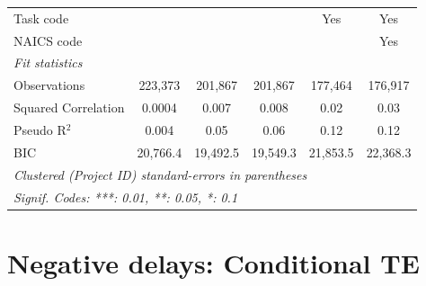\documentclass[
]{article}
\begin{document}
\begin{table}[htbp]
\begin{tabular}{lccccc}
      Task code                    &               &                &               & Yes           & Yes\\  
      NAICS code                   &               &                &               &               & Yes\\  
      \midrule
      \emph{Fit statistics}\\
      Observations                 & 223,373       & 201,867        & 201,867       & 177,464       & 176,917\\  
      Squared Correlation          & 0.0004        & 0.007          & 0.008         & 0.02          & 0.03\\  
      Pseudo R$^2$                 & 0.004         & 0.05           & 0.06          & 0.12          & 0.12\\  
      BIC                          & 20,766.4      & 19,492.5       & 19,549.3      & 21,853.5      & 22,368.3\\  
      \midrule \midrule
      \multicolumn{6}{l}{\emph{Clustered (Project ID) standard-errors in parentheses}}\\
      \multicolumn{6}{l}{\emph{Signif. Codes: ***: 0.01, **: 0.05, *: 0.1}}\\
   \end{tabular}
\end{table}

\hypertarget{negative-delays-conditional-te}{%
\section{Negative delays: Conditional
TE}\label{negative-delays-conditional-te}}
\end{document}
